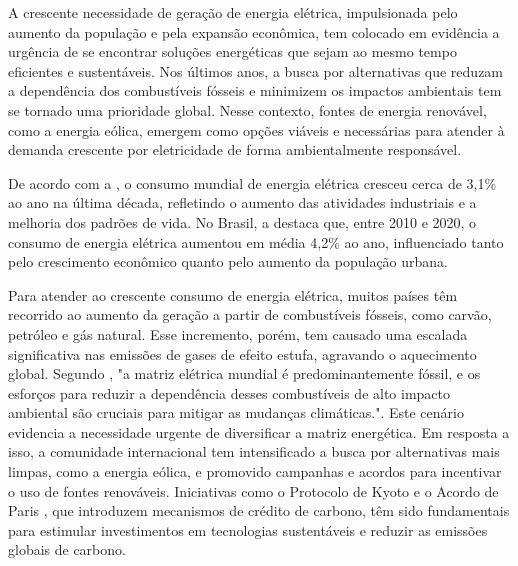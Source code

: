\par A crescente necessidade de geração de energia elétrica, impulsionada pelo aumento da população e pela expansão econômica, tem colocado em evidência a urgência de se encontrar soluções energéticas que sejam ao mesmo tempo eficientes e sustentáveis. Nos últimos anos, a busca por alternativas que reduzam a dependência dos combustíveis fósseis e minimizem os impactos ambientais tem se tornado uma prioridade global. Nesse contexto, fontes de energia renovável, como a energia eólica, emergem como opções viáveis e necessárias para atender à demanda crescente por eletricidade de forma ambientalmente responsável.
\par De acordo com a , o consumo mundial de energia elétrica cresceu cerca de 3,1\% ao ano na última década, refletindo o aumento das atividades industriais e a melhoria dos padrões de vida. No Brasil, a  destaca que, entre 2010 e 2020, o consumo de energia elétrica aumentou em média 4,2\% ao ano, influenciado tanto pelo crescimento econômico quanto pelo aumento da população urbana. 
\par Para atender ao crescente consumo de energia elétrica, muitos países têm recorrido ao aumento da geração a partir de combustíveis fósseis, como carvão, petróleo e gás natural. Esse incremento, porém, tem causado uma escalada significativa nas emissões de gases de efeito estufa, agravando o aquecimento global. Segundo , "a matriz elétrica mundial é predominantemente fóssil, e os esforços para reduzir a dependência desses combustíveis de alto impacto ambiental são cruciais para mitigar as mudanças climáticas.". Este cenário evidencia a necessidade urgente de diversificar a matriz energética. Em resposta a isso, a comunidade internacional tem intensificado a busca por alternativas mais limpas, como a energia eólica, e promovido campanhas e acordos para incentivar o uso de fontes renováveis. Iniciativas como o Protocolo de Kyoto \cite{kyoto2024} e o Acordo de Paris \cite{paris2024}, que introduzem mecanismos de crédito de carbono, têm sido fundamentais para estimular investimentos em tecnologias sustentáveis e reduzir as emissões globais de carbono.
